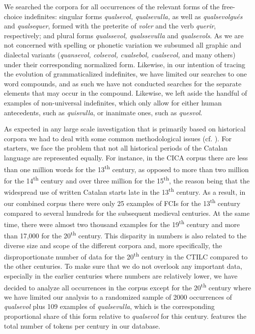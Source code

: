 \documentclass[output=paper,colorlinks,citecolor=brown]{langscibook}
\begin{document}
We searched the corpora for all occurrences of the relevant forms of the free-choice indefinites: singular forms \textit{qualsevol, qualsevulla,} as well as \textit{qualsevolgués} and \textit{qualsequer}, formed with the preterite of \textit{voler} and the verb \textit{querir}, respectively;  and plural forms \textit{qualssevol, qualssevulla} and \textit{qualsevols}. As we are not concerned with spelling or phonetic variation we subsumed all graphic and dialectal variants (\textit{quansevol, colsevol, cualsebol, cualsevol,} and many others) under their corresponding normalized form. Likewise, in our intention of tracing the evolution of grammaticalized indefinites, we have limited our searches to one word compounds, and as such we have not conducted searches for the separate elements that may occur in the compound. Likewise, we left aside the handful of examples of non-universal indefinites, which only allow for either human antecedents, such as \textit{quisvulla}, or inanimate ones, such as \textit{quesvol}.\largerpage[2]

As expected in any large scale investigation that is primarily based on historical corpora we had to deal with some common methodological issues (cf. \cite{EnriqueArias2012, EnriqueArias2018}). For starters, we face the problem that not all historical periods of the Catalan language are represented equally. For instance, in the CICA corpus there are less than one million words for the 13\textsuperscript{th} century, as opposed to more than two million for the 14\textsuperscript{th} century and over three million for the 15\textsuperscript{th}, the reason being that the widespread use of written Catalan starts late in the 13\textsuperscript{th} century. As a result, in our combined corpus there were only 25 examples of FCIs for the 13\textsuperscript{th} century compared to several hundreds for the subsequent medieval centuries. At the same time, there were almost two thousand examples for the 19\textsuperscript{th} century and more than 17,000 for the 20\textsuperscript{th} century. This disparity in numbers is also related to the diverse size and scope of the different corpora and, more specifically, the disproportionate number of data for the 20\textsuperscript{th} century in the CTILC compared to the other centuries. To make sure that we do not overlook any important data, especially in the earlier centuries where numbers are relatively lower, we have decided to analyze all occurrences in the corpus except for the 20\textsuperscript{th} century where we have limited our analysis to a randomized sample of 2000 occurrences of \textit{qualsevol} plus 109 examples of \textit{qualsevulla}, which is the corresponding proportional share of this form relative to \textit{qualsevol} for this century.  features the total number of tokens per century in our database.
\end{document}
